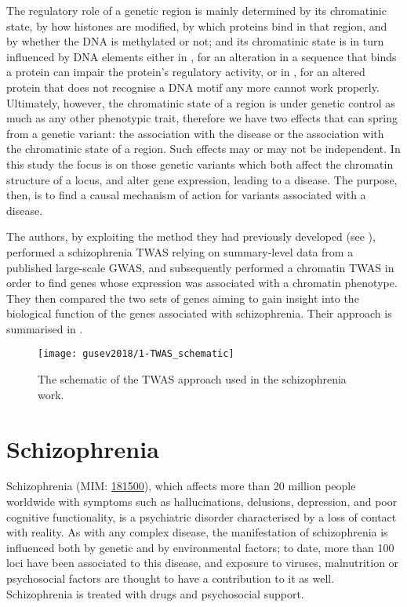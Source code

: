 \documentclass[../main.tex]{subfiles}
\begin{document}
The regulatory role of a genetic region is mainly determined by its 
chromatinic state, \ie by how histones are modified, by which proteins 
bind in that region, and by whether the DNA is methylated or not; and 
its chromatinic state is in turn influenced by DNA elements either in 
\cis, for an alteration in a sequence that binds a protein can impair 
the protein's regulatory activity, or in \trans, for an altered protein 
that does not recognise a DNA motif any more cannot work properly. 
Ultimately, however, the chromatinic state of a region is under genetic 
control as much as any other phenotypic trait, therefore we have two 
effects that can spring from a genetic variant: the association with the 
disease or the association with the chromatinic state of a region. Such 
effects may or may not be independent. In this study the focus is on 
those genetic variants which both affect the chromatin structure of a 
locus, and alter gene expression, leading to a disease. The purpose, 
then, is to find a causal mechanism of action for variants associated 
with a disease.

The authors, by exploiting the method they had previously developed (see 
), performed a schizophrenia TWAS relying on 
summary-level data from a published large-scale GWAS, and subsequently 
performed a chromatin TWAS in order to find genes whose expression was 
associated with a chromatin phenotype. They then compared the two sets 
of genes aiming to gain insight into the biological function of the 
genes associated with schizophrenia. Their approach is summarised in 
.

\begin{figure}
	\centering
	\texttt{[image: gusev2018/1-TWAS\_schematic]}
	\caption{The schematic of the TWAS approach used in the 
schizophrenia work.}
\end{figure}

\section{Schizophrenia}

Schizophrenia (MIM: \href{https://omim.org/entry/181500}{181500}), which 
affects more than 20 million people worldwide with symptoms such as 
hallucinations, delusions, depression, and poor cognitive functionality, 
is a psychiatric disorder characterised by a loss of contact with 
reality. As with any complex disease, the manifestation of schizophrenia 
is influenced both by genetic and by environmental factors; to date, 
more than 100 loci have been associated to this disease, and exposure to 
viruses, malnutrition or psychosocial factors are thought to have a 
contribution to it as well. Schizophrenia is treated with drugs and 
psychosocial support.
\end{document}
